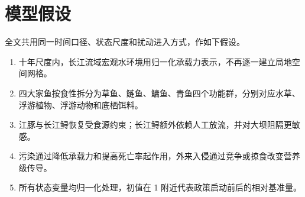 \section{模型假设}
全文共用同一时间口径、状态尺度和扰动进入方式，作如下假设。
\begin{enumerate}
\item 十年尺度内，长江流域宏观水环境用归一化承载力表示，不再逐一建立局地空间网格。
\item 四大家鱼按食性拆分为草鱼、鲢鱼、鳙鱼、青鱼四个功能群，分别对应水草、浮游植物、浮游动物和底栖饵料。
\item 江豚与长江鲟恢复受食源约束；长江鲟额外依赖人工放流，并对大坝阻隔更敏感。
\item 污染通过降低承载力和提高死亡率起作用，外来入侵通过竞争或掠食改变营养级传导。
\item 所有状态变量均归一化处理，初值在 1 附近代表政策启动前后的相对基准量。
\end{enumerate}

